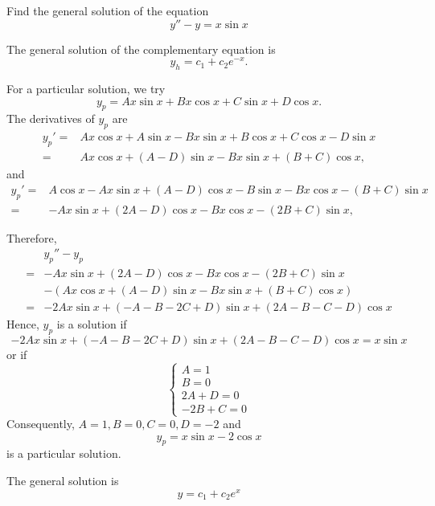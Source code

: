 \begin{example}
  Find the general solution of the equation 
	\[  y'' -  y = x \sin x \]
\end{example}
\begin{solution}
The general solution of the complementary equation is
\[y_h=c_1+c_2e^{-x}.\]

For a particular solution, we try 
\[y_p = Ax\sin x+Bx\cos x+C\sin x+D\cos x.\]
The derivatives of $y_p$ are
\[
\begin{aligned}
  y_p' = &Ax \cos x + A \sin x - Bx \sin x + B \cos x+C\cos x-D\sin x\\
  = &Ax \cos x + (A-D)\sin x - Bx \sin x + (B+C)\cos x,
\end{aligned}  
\]
and
\[
\begin{aligned}
  y_p' = &A\cos x-Ax\sin x + (A-D)\cos x - B\sin x -Bx\cos x - (B+C)\sin x\\
  = &-Ax\sin x + (2A-D)\cos x -Bx\cos x - (2B+C)\sin x,
\end{aligned}  
\]

Therefore, 
	\[ 
	\begin{split}
	& y_p'' - y_p \\
	= &  -Ax\sin x + (2A-D)\cos x -Bx\cos x - (2B+C)\sin x\\
	&-(Ax \cos x + (A-D)\sin x - Bx \sin x + (B+C)\cos x)\\
	=& -2Ax\sin x+(-A-B-2C+D)\sin x+(2A-B-C-D)\cos x
	\end{split}
	\]
	Hence, $y_p$ is a solution if 
	\[  -2Ax\sin x+(-A-B-2C+D)\sin x+(2A-B-C-D)\cos x = x \sin x\]
	or if
	\[\begin{cases}
	A=1\\
	B=0\\
	2A+D=0\\
	-2B+C=0
	\end{cases}
	\]
	Consequently, $A=1,B=0,C=0,D=-2$
	and
	\[y_p =  x \sin x-2\cos x\]
	is a particular solution.

  The general solution is
  \[y=c_1+c_2e^x\]
\end{solution}

